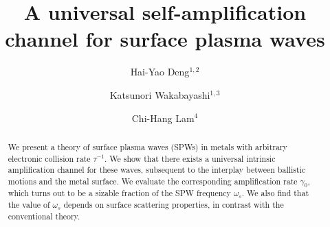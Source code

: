 \documentclass[aps,reprint]{revtex4-1}
\begin{document}

\title{A universal self-amplification channel for surface plasma waves}


\author{Hai-Yao Deng$^{1,2}$}
\author{Katsunori Wakabayashi$^{1,3}$}
\author{Chi-Hang Lam$^4$}


\begin{abstract} 
We present a theory of surface plasma waves (SPWs) in metals with arbitrary electronic collision rate $\tau^{-1}$. We show that there exists a universal intrinsic amplification channel for these waves, subsequent to the interplay between ballistic motions and the metal surface. We evaluate the corresponding amplification rate $\gamma_{0}$, which turns out to be a sizable fraction of the SPW frequency $\omega_s$. We also find that the value of $\omega_s$ depends on surface scattering properties, in contrast with the conventional theory. 
\end{abstract}

\end{document}

